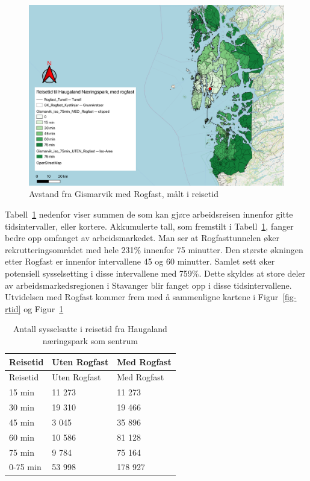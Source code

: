 \documentclass[
]{article}
\begin{document}
\begin{figure}[H]

{\centering \includegraphics{bilder/reisetid_rogfast.png}

}

\caption{\label{fig-tid-rf}Avstand fra Gismarvik med Rogfast, målt i
reisetid}

\end{figure}

Tabell~\ref{tbl-rogfast} nedenfor viser summen de som kan gjøre
arbeidsreisen innenfor gitte tidsintervaller, eller kortere. Akkumulerte
tall, som fremstilt i Tabell~\ref{tbl-rogfast}, fanger bedre opp
omfanget av arbeidsmarkedet. Man ser at Rogfasttunnelen øker
rekrutteringsområdet med hele 231\% innenfor 75 minutter. Den største
økningen etter Rogfast er innenfor intervallene 45 og 60 minutter.
Samlet sett øker potensiell sysselsetting i disse intervallene med
759\%. Dette skyldes at store deler av arbeidsmarkedsregionen i
Stavanger blir fanget opp i disse tidsintervallene. Utvidelsen med
Rogfast kommer frem med å sammenligne kartene i Figur~\ref{fig-rtid} og
Figur~\ref{fig-tid-rf}

\hypertarget{tbl-rogfast}{}
\begin{longtable}[]{@{}lll@{}}
\caption{\label{tbl-rogfast}Antall sysselsatte i reisetid fra Haugaland
næringspark som sentrum }\tabularnewline
\toprule()
Reisetid & Uten Rogfast & Med Rogfast \\
\midrule()
\endfirsthead
\toprule()
Reisetid & Uten Rogfast & Med Rogfast \\
\midrule()
\endhead
15 min & 11 273 & 11 273 \\
30 min & 19 310 & 19 466 \\
45 min & 3 045 & 35 896 \\
60 min & 10 586 & 81 128 \\
75 min & 9 784 & 75 164 \\
0-75 min & 53 998 & 178 927 \\
\bottomrule()
\end{longtable}
\end{document}
